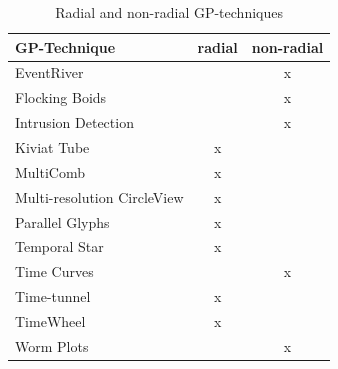 \begin{table}[th]
	\centering
	\caption[Table 1]{Radial and non-radial GP-techniques}
	\label{radialTable}
	\begin{tabu}{lcc}
	\toprule
	GP-Technique & radial & non-radial \\
	\midrule
	EventRiver &  & x \\
	Flocking Boids &  & x \\
	Intrusion Detection &  & x \\
	Kiviat Tube & x &  \\
	MultiComb & x &  \\
	Multi-resolution CircleView & x &  \\
	Parallel Glyphs & x &  \\
    Temporal Star & x &  \\
	Time Curves &  & x \\
	Time-tunnel & x & \\
	TimeWheel & x & \\
	Worm Plots &  & x\\
	\bottomrule
	\end{tabu}
\end{table}

